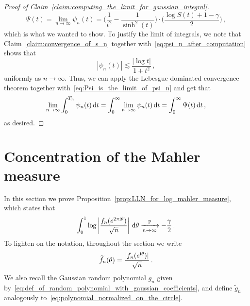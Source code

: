 \documentclass[11pt]{amsart}
\theoremstyle{remark}
\theoremstyle{definition}
\newcommand{\bP}{\mathbb P}
\newcommand{\I}{{\rm i}}
\begin{document}
\begin{proof}[Proof of Claim~\ref{claim:computing_the_limit_for_gaussian_integral}]
        \begin{equation}
        \label{eq:Psi_is_the_limit_of_psi_n}
            \Psi(t) = \lim_{n\to\infty} \psi_n(t) = \Big(\frac{1}{t^2} - \frac{1}{\sinh^2(t)}\Big) \cdot \Big(\frac{\log S(t) + 1-\gamma}{2}\Big) \, ,
        \end{equation}
        which is what we wanted to show. To justify the limit of integrals, we note that Claim~\ref{claim:convergence_of_s_n} together with~\eqref{eq:psi_n_after_computation} shows that
        \begin{equation*}
            |\psi_n(t)| \lesssim \frac{|\log t|}{1+t^2} \, ,
        \end{equation*}
        uniformly as $n\to \infty$. Thus, we can apply the Lebesgue dominated convergence theorem together with~\eqref{eq:Psi_is_the_limit_of_psi_n} and get that
        \[
         \lim_{n\to \infty} \int_{0}^{T_n} \psi_n(t) \,  {\rm d}t = \int_{0}^\infty \lim_{n\to\infty} \psi_n(t) \, {\rm d}t = \int_{0}^{\infty}\Psi(t) \, {\rm d}t \, ,
        \]
        as desired. 
    \end{proof}
    \section{Concentration of the Mahler measure}
    \label{sec:concentration_of_the_Mahler_measure}
    \noindent
    In this section we prove Proposition~\ref{prop:LLN_for_log_mahler_measure}, which states that
    \begin{equation}
    \label{eq:concentration_of_mahler_measure_what_we_want}
        \int_0^1\log \left|\frac{f_n(e^{2\pi \I \theta})}{\sqrt{n}} \right|\,{\rm d}\theta \xrightarrow[n\to \infty]{\bP} -\frac{\gamma}{2} \, .
    \end{equation}
    To lighten on the notation, throughout the section we write
    \begin{equation}
        \label{eq:polynomial_normalized_on_the_circle}
        \widetilde{f}_n(\theta) = \frac{|f_n(e^{\I\theta})|}{\sqrt{n}} \, .
    \end{equation}
    We also recall the Gaussian random polynomial $g_n$ given by~\eqref{eq:def_of_random_polynomial_with_gaussian_coefficients}, and define $\widetilde{g}_n$ analogously to~\eqref{eq:polynomial_normalized_on_the_circle}. 
    
\end{document}
